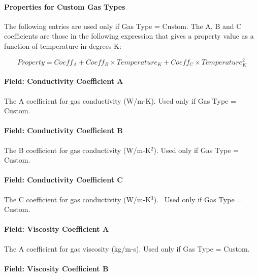 \paragraph{Properties for Custom Gas Types}\label{properties-for-custom-gas-types-1}

The following entries are used only if Gas Type = Custom. The A, B and C coefficients are those in the following expression that gives a property value as a function of temperature in degrees K:

\begin{equation}
Property = Coef{f_A} + Coef{f_B} \times Temperatur{e_K} + Coef{f_C} \times Temperature_K^2
\end{equation}

\paragraph{Field: Conductivity Coefficient A}\label{field-conductivity-coefficient-a-1}

The A coefficient for gas conductivity (W/m-K). Used only if Gas Type = Custom.

\paragraph{Field: Conductivity Coefficient B}\label{field-conductivity-coefficient-b-1}

The B coefficient for gas conductivity (W/m-K\(^{2}\)). Used only if Gas Type = Custom.

\paragraph{Field: Conductivity Coefficient C}\label{field-conductivity-coefficient-c-1}

The C coefficient for gas conductivity (W/m-K\(^{3}\)).~ Used only if Gas Type = Custom.

\paragraph{Field: Viscosity Coefficient A}\label{field-viscosity-coefficient-a-1}

The A coefficient for gas viscosity (kg/m-s). Used only if Gas Type = Custom.

\paragraph{Field: Viscosity Coefficient B}\label{field-viscosity-coefficient-b-1}

